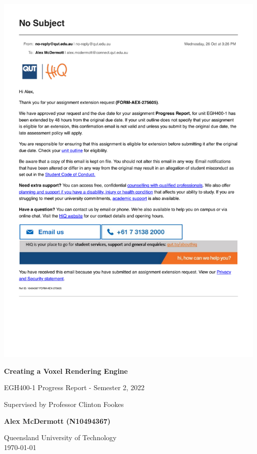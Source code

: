 \documentclass[titlepage]{article}
\begin{document}
\begin{center}
    \includegraphics[scale=0.75]{Extension.pdf}
\end{center}

\begin{titlepage}
    \begin{center}
        \vspace*{7cm}

        \Huge
        \textbf{Creating a Voxel Rendering Engine}

        \vspace{0.5cm}

        \Large
        EGH400-1 Progress Report - Semester 2, 2022

        \vspace{0.25cm}

        \large
        Supervised by Professor Clinton Fookes

        \vspace{0.5cm}

        \Large
        \textbf{Alex McDermott (N10494367)}

        \vfill

        \Large
        Queensland University of Technology\\
        \today
    \end{center}
\end{titlepage}
\end{document}
